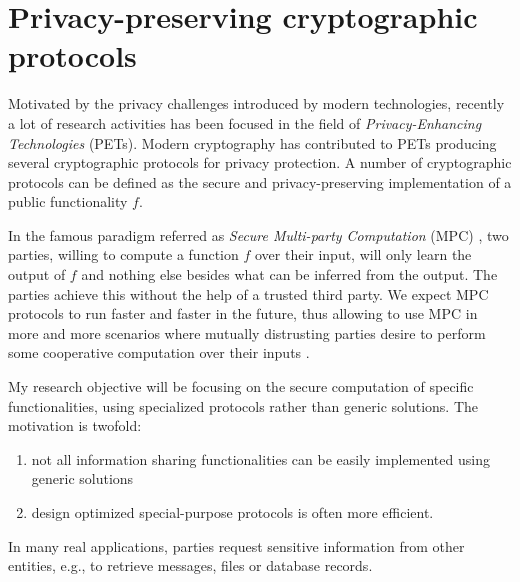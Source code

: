 \documentclass[dvips,12pt]{article}
\begin{document}

%


\section{Privacy-preserving cryptographic protocols}
Motivated by the privacy challenges introduced by modern technologies, recently a lot of research activities has been focused in the field of \emph{Privacy-Enhancing Technologies} (PETs).
Modern cryptography has contributed to PETs producing several cryptographic protocols for privacy protection. 
A number of cryptographic protocols can be defined as the secure and privacy-preserving implementation of a public functionality $f$.

In the famous paradigm referred as \emph{Secure Multi-party Computation} (MPC) \cite{Yao}, two parties, willing to compute a function $f$ over their input, will only learn the output of $f$ and nothing else besides what can be inferred from the output. 
The parties achieve this without the help of a trusted third party.
We expect MPC protocols to run faster and faster in the future, thus allowing to use MPC in more
and more scenarios where mutually distrusting parties desire to perform some cooperative computation over their inputs \cite{orlandi2011multiparty}.

My research objective will be focusing on the secure computation of specific functionalities, using specialized protocols rather than generic solutions.
The motivation is twofold:
\begin{enumerate}
\item not all information sharing functionalities can be easily implemented using generic solutions
\item design optimized special-purpose protocols is often more efficient.
\end{enumerate} 
In many real applications, parties request sensitive information from other entities, e.g., to retrieve messages, files or database records. 
\end{document}
